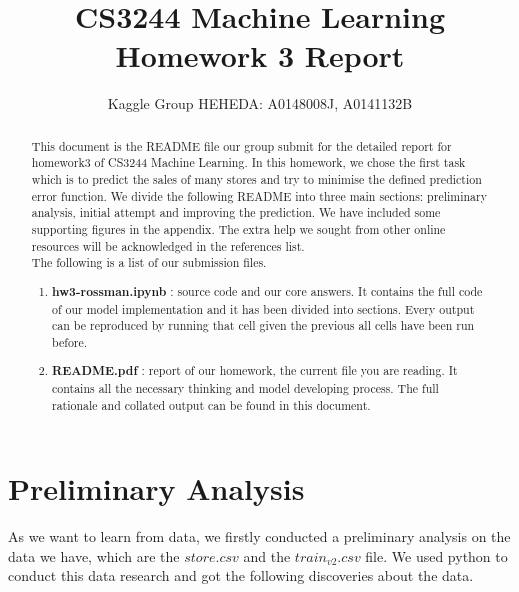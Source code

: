 \documentclass{article}
\title{CS3244 Machine Learning Homework 3 Report}
\author{Kaggle Group HEHEDA: A0148008J, A0141132B}
\begin{document}
\maketitle



\begin{abstract}
This document is the README file our group submit for the detailed report for homework3 of CS3244 Machine Learning. In this homework, we chose the first task which is to predict the sales of many stores and try to minimise the defined prediction error function. We divide the following README into three main sections: preliminary analysis, initial attempt and improving the prediction. We have included some supporting figures in the appendix. The extra help we sought from other online resources will be acknowledged in the references list.\\

The following is a list of our submission files.\\

  \begin{enumerate}
  \item \textbf{hw3-rossman.ipynb} : source code and our core answers. It contains the full code of our model implementation and it has been divided into sections. Every output can be reproduced by running that cell given the previous all cells have been run before.
  \item \textbf{README.pdf} : report of our homework, the current file you are reading. It contains all the necessary thinking and model developing process. The full rationale and collated output can be found in this document.
  \end{enumerate}
  
\end{abstract}

\newpage

\tableofcontents

\newpage

\section{Preliminary Analysis}
As we want to learn from data, we firstly conducted a preliminary analysis on the data we have, which are the $store.csv$ and the $train_{v2}.csv$ file. We used python to conduct this data research and got the following discoveries about the data.
\end{document}
